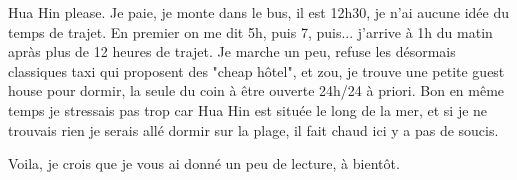 \begin{multicols}{2}
Hua Hin please. Je paie, je monte dans le bus, il est 12h30, je n'ai aucune idée du temps de trajet. En premier on me dit 5h, puis 7, puis... j'arrive à 1h du matin apràs plus de 12 heures de trajet. Je marche un peu, refuse les désormais classiques taxi qui proposent des "cheap hôtel", et zou, je trouve une petite guest house pour dormir, la seule du coin à être ouverte 24h/24 à priori. Bon en même temps je stressais pas trop car Hua Hin est située le long de la mer, et si je ne trouvais rien je serais allé dormir sur la plage, il fait chaud ici y a pas de soucis.

Voila, je crois que je vous ai donné un peu de lecture, à bientôt.

\end{multicols}
